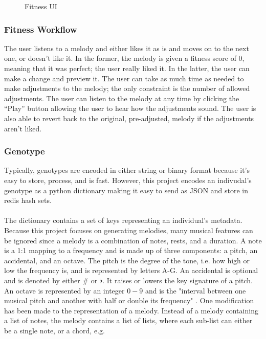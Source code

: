 \documentclass[12pt]{article} %
\begin{document}
\begin{figure}[H]
\caption{Fitness UI}
\label{fig:fitness_ui}
\end{figure}

\subsubsection{Fitness Workflow}
The user listens to a melody and either likes it as is and moves on to the next one, or doesn't like it. In the former, the melody is given a fitness score of 0, meaning that it was perfect; the user really liked it. In the latter, the user can make a change and preview it. The user can take as much time as needed to make adjustments to the melody; the only constraint is the number of allowed adjustments. The user can listen to the melody at any time by clicking the “Play” button allowing the user to hear how the adjustments sound. The user is also able to revert back to the original, pre-adjusted, melody if the adjustments aren't liked. 

\subsubsection{Genotype}
Typically, genotypes are encoded in either string or binary format because it's easy to store, process, and is fast. However, this project encodes an indivudal's genotype as a python dictionary making it easy to send as JSON and store in redis hash sets. \\
\\
The dictionary contains a set of keys representing an individual's metadata. Because this project focuses on generating melodies, many musical features can be ignored since a melody is a combination of notes, rests, and a duration. A note is a 1:1 mapping to a frequency and is made up of three components: a pitch, an accidental, and an octave.  The pitch is the degree of the tone, i.e. how high or low the frequency is, and is represented by letters A-G. An accidental is optional and is denoted by either $\#$ or $\flat$. It raises or lowers the key signature of a pitch. An octave is represented by an integer $0-9$ and is the "interval between one musical pitch and another with half or double its frequency" \cite{website:wiki_octave}. One modification has been made to the representation of a melody. Instead of a melody containing a list of notes, the melody contains a list of lists, where each sub-list can either be a single note, or a chord, e.g.
\end{document}
